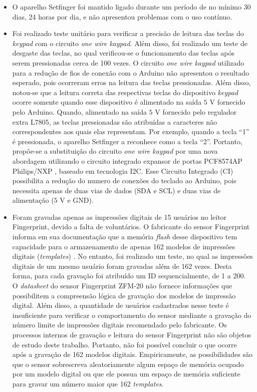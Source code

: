 \begin{itemize}
    \item O aparelho Setfinger foi mantido ligado durante um período de no mínimo 30 dias, 24 horas por dia, e não apresentou problemas com o uso contínuo.
    
    \item Foi realizado teste unitário para verificar a precisão de leitura das teclas do \textit{keypad} com o circuito \textit{one wire kaypad}. Além disso, foi realizado um teste de desgaste das teclas, no qual verificou-se o funcionamento das teclas após serem pressionadas cerca de 100 vezes. O circuito \textit{one wire kaypad} utilizado para a redução de fios de conexão com o Arduino não apresentou o resultado esperado, pois ocorreram erros na leitura das teclas pressionadas. Além disso, notou-se que a leitura correta das respectivas teclas do dispositivo \textit{keypad} ocorre somente quando esse dispositivo é alimentado na saída $5$ V fornecido pelo Arduino. Quando, alimentado na saída $5$ V fornecido pelo regulador extra L7805, as teclas pressionadas são atribuídas a caracteres não correspondentes aos quais elas representam. Por exemplo, quando a tecla ``1'' é pressionada, o aparelho Setfinger a reconhece como a tecla ``2''. Portanto, propõe-se a substituição do circuito \textit{one wire kaypad} por uma nova abordagem utilizando o circuito integrado expansor de portas PCF8574AP Philips/NXP \cite{pcf8574}, baseado em tecnologia I2C. Esse Circuito Integrado (CI) possibilita a redução do numero de conexões do teclado ao Arduino, pois necessita apenas de duas vias de dados (SDA e SCL) e duas vias de alimentação ($5$ V e GND).

    
    
    \item Foram gravadas apenas as impressões digitais de 15 usuários no leitor Fingerprint, devido a falta de voluntários. O fabricante do sensor Fingerprint informa em sua documentação que a memória \textit{flash} desse dispositivo tem capacidade para o armazenamento de apenas 162 modelos de impressões digitais (\textit{templates}) \cite{zfm-20, zfm20ada}. No entanto, foi realizado um teste, no qual as impressões digitais de um mesmo usuário foram gravadas além de 162 vezes. Desta forma, para cada gravação foi atribuído um ID sequencialmente, de 1 a 200. O \textit{datasheet} do sensor Fingerprint ZFM-20 não fornece informações que possibilitem a compreensão lógica de gravação dos modelos de impressão digital. Além disso, a quantidade de usuários cadastrados nesse teste é insuficiente para verificar o comportamento do sensor mediante a gravação do número limite de impressões digitais recomendado pelo fabricante. Os processos internos de gravação e leitura do sensor Fingerprint não são objetos de estudo deste trabalho. Portanto, não foi possível concluir o que ocorre após a gravação de 162 modelos digitais. Empiricamente, as possibilidades são que o sensor sobrescreva aleatoriamente algum espaço de memória ocupado por um modelo digital ou que ele possua um espaço de memória suficiente para gravar um número maior que 162 \textit{templates}. 
    

\end{itemize}
